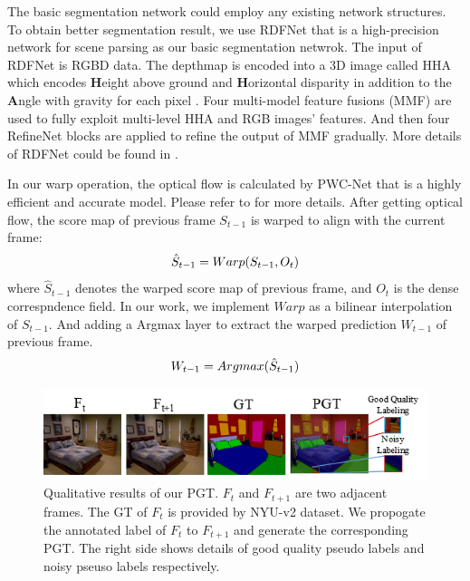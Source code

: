 The basic segmentation network could employ any existing network structures. 
%
To obtain better segmentation result, we use RDFNet\cite{Park2017} that is a high-precision network for scene parsing as our basic segmentation netwrok. 
%
The input of RDFNet is RGBD data. 
%
The depthmap is encoded into a 3D image called HHA \cite{Gupta2014} which encodes {\bf H}eight above ground and {\bf H}orizontal disparity in addition to the {\bf A}ngle with gravity for each pixel .
%
Four multi-model feature fusions (MMF) are used to fully exploit multi-level HHA and RGB images' features.
%
And then four RefineNet blocks are applied to refine the output of MMF gradually.
%
More details of RDFNet could be found in \cite{Park2017}. 

In our warp operation, the optical flow is calculated by PWC-Net \cite{Sun2018} that is a highly efficient and accurate model.
%
Please refer to \cite{Sun2018} for more details.
%
After getting optical flow, the score map of previous frame ${S_{t-1}}$ is warped to align with the current frame:
\begin{equation}
\centering
\hat{S}_{t-1}=Warp(S_{t-1},O_t)
\end{equation}
where ${\hat{S}_{t-1}}$ denotes the warped score map of previous frame, and ${O_t}$ is the dense correspndence field. 
%
In our work, we implement ${Warp}$ as a bilinear interpolation of $S_{t-1}$.
%
And adding a Argmax layer to extract the warped prediction ${W_{t-1}}$ of previous frame.
\begin{equation}
\centering
W_{t-1}=Argmax(\hat{S}_{t-1})
\end{equation}

\begin{figure}[htpb]
	\centering
	\includegraphics[scale=0.61]{figure/PGT.png}
	\vspace*{-0.6cm} 
	\caption{Qualitative results of our PGT. $F_t$ and $F_{t+1}$ are two adjacent frames. The GT of $F_t$ is provided by NYU-v2 dataset. We propogate the annotated label of $F_{t}$ to $F_{t+1}$ and generate the corresponding PGT. The right side shows details of good quality pseudo labels and noisy pseuso labels respectively.}
	\label{fig:PGT}
	\vspace*{-0.35cm} 
\end{figure}

